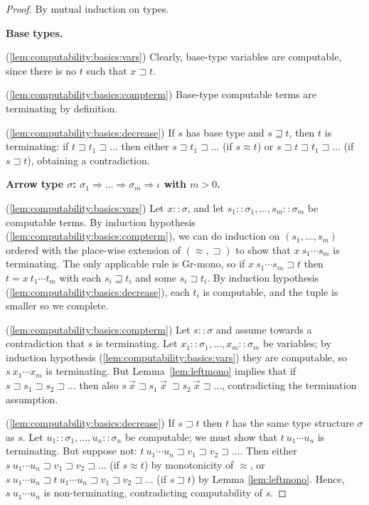 \documentclass[a4paper,USenglish,cleveref,autoref,thm-restate]{lipics-v2021}
\newcommand{\arrtype}{\Rightarrow}
\newcommand{\grmain}{\sqsupset}
\newcommand{\geqmain}{\sqsupseteq}
\newcommand{\ismain}{\approx}
\newcommand{\atype}{\sigma}
\newcommand{\asort}{\iota}
\newcommand{\avar}{x}
\begin{document}
\begin{proof}
By mutual induction on types.

\textbf{Base types.}

(\ref{lem:computability:basics:vars})
Clearly, base-type variables are computable, since there is no $t$ such that $x \grmain t$.

(\ref{lem:computability:basics:compterm})
Base-type computable terms are terminating by definition.

(\ref{lem:computability:basics:decrease})
If $s$ has base type and $s \geqmain t$, then $t$ is terminating: if $t \grmain t_1 \grmain
\dots$ then either $s \grmain t_1 \grmain \dots$ (if $s \ismain t$) or $s \grmain t \grmain
t_1 \grmain \dots$ (if $s \grmain t$), obtaining a contradiction.

\textbf{Arrow type $\atype$: $\atype_1 \arrtype \dots \arrtype \atype_m \arrtype \asort$ with
$m > 0$.}

(\ref{lem:computability:basics:vars})
Let $\avar :: \atype$, and let $s_1 :: \atype_1,\dots,s_m :: \atype_m$ be computable terms.
By induction hypothesis (\ref{lem:computability:basics:compterm}), we can do induction on
$(s_1,\dots,s_m)$ ordered with the place-wise extension of $(\ismain,\grmain)$ to show that
$\avar\ s_1 \cdots s_m$ is terminating.  The only applicable rule is Gr-mono, so if $\avar\ 
s_1 \cdots s_m \grmain t$ then $t = \avar\ t_1 \cdots t_m$ with each $s_i \geqmain t_i$ and
some $s_i \grmain t_i$.  By induction hypothesis (\ref{lem:computability:basics:decrease}),
each $t_i$ is computable, and the tuple is smaller so we complete.

(\ref{lem:computability:basics:compterm})
Let $s:: \atype$ and assume towards a contradiction that $s$ is terminating.
Let $x_1 :: \atype_1,\dots,x_m ::\atype_m$ be variables; by induction hypothesis
(\ref{lem:computability:basics:vars}) they are computable, so $s\ x_1 \cdots x_m$ is terminating.
But Lemma~\ref{lem:leftmono} implies that if $s \grmain s_1 \grmain s_2 \grmain \dots$ then also
$s\ \vec{x} \grmain s_1\ \vec{x}\ \grmain s_2\ \vec{x} \grmain \dots$, contradicting the termination
assumption.

(\ref{lem:computability:basics:decrease})
If $s \grmain t$ then $t$ has the same type structure $\atype$ as $s$.  Let
$u_1 :: \atype_1,\dots,u_n :: \atype_n$ be computable; we must show that
$t\ u_1 \cdots u_n$ is terminating.  But suppose not: $t\ u_1 \cdots u_n \grmain v_1 \grmain v_2
\grmain \dots$.  Then either $s\ u_1 \cdots u_n \grmain v_1 \grmain v_2 \grmain \dots$ (if $s
\ismain t$) by monotonicity of $\ismain$, or $s\ u_1 \cdots u_n \grmain t\ u_1 \cdots u_n
\grmain v_1 \grmain v_2 \grmain\dots$ (if $s \grmain t$) by Lemma \ref{lem:leftmono}.  Hence,
$s\ u_1 \cdots u_n$ is non-terminating, contradicting computability of $s$.
\end{proof}
\end{document}

